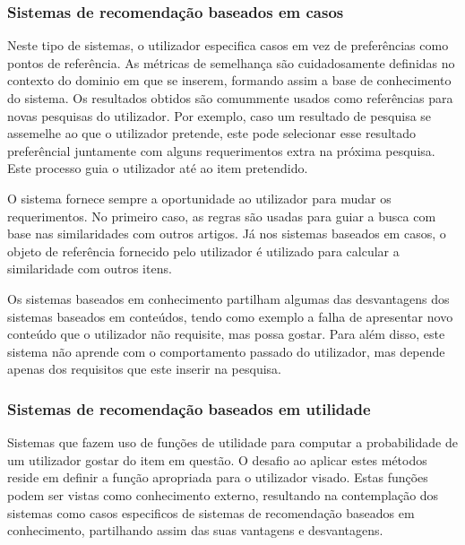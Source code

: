 \subsubsection{Sistemas de recomendação baseados em casos}
\hfill
\newline
\par Neste tipo de sistemas, o utilizador especifica casos em vez de preferências como pontos de referência. As métricas de semelhança são cuidadosamente definidas no contexto do dominio em que se inserem, formando assim a base de conhecimento do sistema. Os resultados obtidos são comummente usados como referências para novas pesquisas do utilizador. Por exemplo, caso um resultado de pesquisa se assemelhe ao que o utilizador pretende, este pode selecionar esse resultado preferêncial juntamente com alguns requerimentos extra na próxima pesquisa. Este processo guia o utilizador até ao item pretendido.
\par O sistema fornece sempre a oportunidade ao utilizador para mudar os requerimentos. No primeiro caso, as regras são usadas para guiar a busca com base nas similaridades com outros artigos. Já nos sistemas baseados em casos, o objeto de referência fornecido pelo utilizador é utilizado para calcular a similaridade com outros itens.
\par Os sistemas baseados em conhecimento partilham algumas das desvantagens
dos sistemas baseados em conteúdos, tendo como exemplo a falha de apresentar novo conteúdo que o utilizador não requisite, mas possa gostar. Para além disso, este sistema não aprende com o comportamento passado do utilizador, mas depende apenas dos requisitos que este inserir na pesquisa.
\hfill


\subsubsection{Sistemas de recomendação baseados em utilidade}
\hfill
\newline
\par Sistemas que fazem uso de funções de utilidade para computar a probabilidade de um utilizador gostar do item em questão.
O desafio ao aplicar estes métodos reside em definir a função apropriada para o utilizador visado. Estas funções podem ser vistas como conhecimento externo, resultando na contemplação dos sistemas como casos especificos de sistemas de recomendação baseados em conhecimento, partilhando assim das suas vantagens e desvantagens.
\hfill

